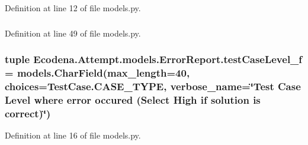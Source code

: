 Definition at line 12 of file models.py.

\hypertarget{class_ecodena_1_1_attempt_1_1models_1_1_error_report_ad6bef1ac293f3dd474cc47975aa77be2}{
\subsubsection[{testCaseLevel\_\-f}]{}}
\label{df/d02/class_ecodena_1_1_attempt_1_1models_1_1_error_report_ad6bef1ac293f3dd474cc47975aa77be2}


Definition at line 49 of file models.py.

\hypertarget{class_ecodena_1_1_attempt_1_1models_1_1_error_report_abb78bf4e72de46a0c4d144d5e95ed80d}{
\subsubsection[{testCaseLevel\_\-f}]{\setlength{\rightskip}{0pt plus 5cm}tuple {\bf Ecodena.Attempt.models.ErrorReport.testCaseLevel\_\-f} = models.CharField(max\_\-length=40, choices=TestCase.CASE\_\-TYPE, verbose\_\-name=\char`\"{}Test Case Level where error occured (Select High if solution is correct)\char`\"{})}}
\label{df/d02/class_ecodena_1_1_attempt_1_1models_1_1_error_report_abb78bf4e72de46a0c4d144d5e95ed80d}


Definition at line 16 of file models.py.

\hypertarget{class_ecodena_1_1_attempt_1_1models_1_1_error_report_ab3b846491a8aa2fa4135ed71f0eedfd0}{
\subsubsection[{timeRequirement\_\-f}]{}}
\label{df/d02/class_ecodena_1_1_attempt_1_1models_1_1_error_report_ab3b846491a8aa2fa4135ed71f0eedfd0}


